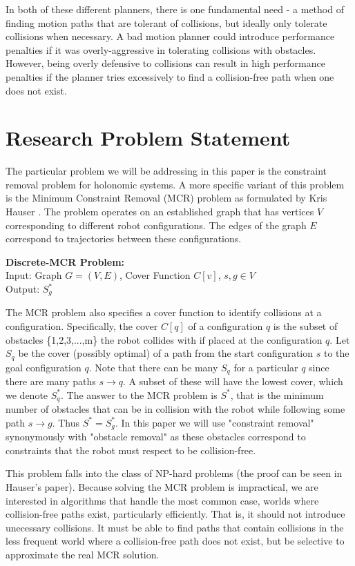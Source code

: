 In both of these different planners, there is one fundamental need - a method of finding motion paths that are tolerant of collisions, but ideally only tolerate collisions when necessary. A bad motion planner could introduce performance penalties if it was overly-aggressive in tolerating collisions with obstacles. However, being overly defensive to collisions can result in high performance penalties if the planner tries excessively to find a collision-free path when one does not exist. 

\section{Research Problem Statement} \label{intro:statement}
The particular problem we will be addressing in this paper is the constraint removal problem for holonomic systems. A more specific variant of this problem is the Minimum Constraint Removal (MCR) problem as formulated by Kris Hauser \cite{hauser:mcr}. The problem operates on an established graph that has vertices $V$ corresponding to different robot configurations. The edges of the graph $E$ correspond to trajectories between these configurations. 

\begin{mdframed}
{\bf{Discrete-MCR Problem:}}\\
Input: Graph $G = (V,E)$, Cover Function $C[v]$, $s,g \in V$ \\
Output: $S^{*}_g$
\end{mdframed}

The MCR problem also specifies a cover function to identify collisions at a configuration. Specifically, the cover $C[q]$ of a configuration $q$ is the subset of obstacles \{1,2,3,...,m\} the robot collides with if placed at the configuration $q$. Let $S_q$ be the cover (possibly optimal) of a path from the start configuration $s$ to the goal configuration $q$. Note that there can be many $S_q$ for a particular $q$ since there are many paths $s \rightarrow q$. A subset of these will have the lowest cover, which we denote $S^{*}_q$. The answer to the MCR problem is $S^{*}$, that is the minimum number of obstacles that can be in collision with the robot while following some path $s \rightarrow g$. Thus $S^{*} = S^{*}_g$. In this paper we will use "constraint removal" synonymously with "obstacle removal" as these obstacles correspond to constraints that the robot must respect to be collision-free.

This problem falls into the class of NP-hard problems (the proof can be seen in Hauser's paper). Because solving the MCR problem is impractical, we are interested in algorithms that handle the most common case, worlds where collision-free paths exist, particularly efficiently. That is, it should not introduce unecessary collisions. It must be able to find paths that contain collisions in the less frequent world where a collision-free path does not exist, but be selective to approximate the real MCR solution.

